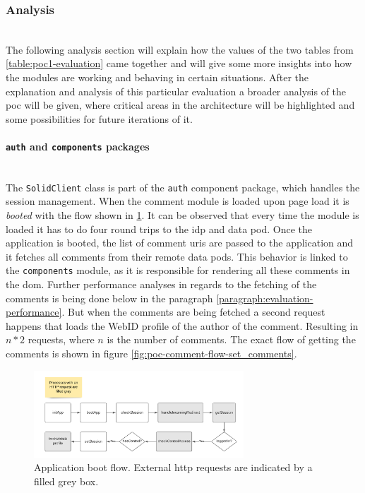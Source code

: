 \subsubsection{Analysis}\mbox{}\\

The following analysis section will explain how the values of the two tables from \ref{table:poc1-evaluation} came together and will give some more insights into how the modules are working and behaving in certain situations. After the explanation and analysis of this particular evaluation a broader analysis of the \gls{poc} will be given, where critical areas in the architecture will be highlighted and some possibilities for future iterations of it.
\vspace{0.5cm}
\paragraph{\texttt{auth} and \texttt{components} packages}\mbox{}\\

The \texttt{SolidClient} class is part of the \texttt{auth} component package, which handles the session management. When the comment module is loaded upon page load it is \textit{booted} with the flow shown in \ref{fig:poc-comment-flow-app_boot}. It can be observed that every time the module is loaded it has to do four round trips to the \gls{idp} and data pod. Once the application is booted, the list of comment \glspl{uri} are passed to the application and it fetches all comments from their remote data pods. This behavior is linked to the \texttt{components} module, as it is responsible for rendering all these comments in the \gls{dom}. Further performance analyses in regards to the fetching of the comments is being done below in the paragraph \ref{paragraph:evaluation-performance}. But when the comments are being fetched a second request happens that loads the WebID profile of the author of the comment. Resulting in $n*2$ requests, where $n$ is the number of comments. The exact flow of getting the comments is shown in figure \ref{fig:poc-comment-flow-set_comments}.

\begin{figure}[!ht]
    \centering
    \includegraphics[width=0.7\textwidth]{prototype/graphs/poc-comment-flow-app_boot.png}
    \caption{Application boot flow. External \gls{http} requests are indicated by a filled grey box.}
    \label{fig:poc-comment-flow-app_boot}
\end{figure}

